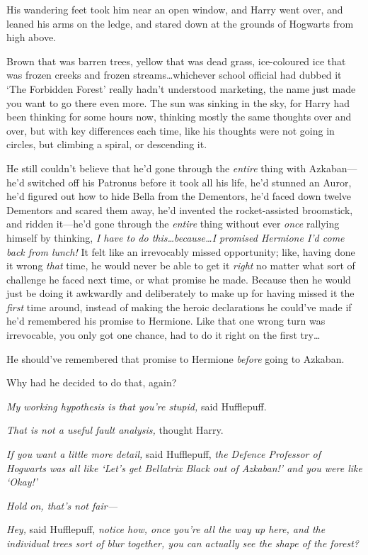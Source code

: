 His wandering feet took him near an open window, and Harry went over, and leaned his arms on the ledge, and stared down at the grounds of Hogwarts from high above.

Brown that was barren trees, yellow that was dead grass, ice-coloured ice that was frozen creeks and frozen streams…whichever school official had dubbed it ‘The Forbidden Forest’ really hadn’t understood marketing, the name just made you want to go there even more. The sun was sinking in the sky, for Harry had been thinking for some hours now, thinking mostly the same thoughts over and over, but with key differences each time, like his thoughts were not going in circles, but climbing a spiral, or descending it.

He still couldn’t believe that he’d gone through the \emph{entire} thing with Azkaban—he’d switched off his Patronus before it took all his life, he’d stunned an Auror, he’d figured out how to hide Bella from the Dementors, he’d faced down twelve Dementors and scared them away, he’d invented the rocket-assisted broomstick, and ridden it—he’d gone through the \emph{entire} thing without ever \emph{once} rallying himself by thinking, \emph{I have to do this…because…I promised Hermione I’d come back from lunch!} It felt like an irrevocably missed opportunity; like, having done it wrong \emph{that} time, he would never be able to get it \emph{right} no matter what sort of challenge he faced next time, or what promise he made. Because then he would just be doing it awkwardly and deliberately to make up for having missed it the \emph{first} time around, instead of making the heroic declarations he could’ve made if he’d remembered his promise to Hermione. Like that one wrong turn was irrevocable, you only got one chance, had to do it right on the first try…

He should’ve remembered that promise to Hermione \emph{before} going to Azkaban.

Why had he decided to do that, again?

\emph{My working hypothesis is that you’re stupid,} said Hufflepuff.

\emph{That is not a useful fault analysis,} thought Harry.

\emph{If you want a little more detail,} said Hufflepuff, \emph{the Defence Professor of Hogwarts was all like ‘Let’s get Bellatrix Black out of Azkaban!’ and you were like ‘Okay!’}

\emph{Hold on, \emph{that’s} not fair—}

\emph{Hey,} said Hufflepuff, \emph{notice how, once you’re all the way up here, and the individual trees sort of blur together, you can actually see the shape of the forest?}

